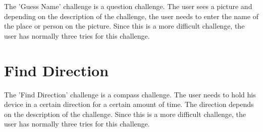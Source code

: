 The 'Guess Name' challenge is a question challenge. The user sees a picture and depending on the description of the challenge, the user needs to enter the name of the place or person on the picture. Since this is a more difficult challenge, the user has normally three tries for this challenge.

\section{Find Direction}

The 'Find Direction' challenge is a compass challenge. The user needs to hold his device in a certain direction for a certain amount of time. The direction depends on the description of the challenge. Since this is a more difficult challenge, the user has normally three tries for this challenge.
